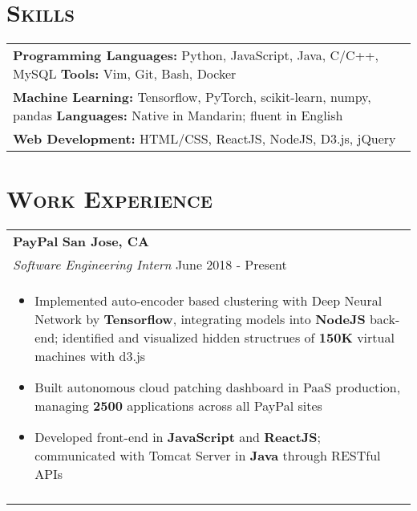 \documentclass[letterpaper,11pt]{article} %
\begin{document}
{\section{\Large\bf\textsc{Skills}}
\begin{tabular}{p{18.5cm}}
{\bf{Programming Languages:}} Python, JavaScript, Java, C/C++, MySQL
\hspace{3.7mm} {\bf{Tools:}} Vim, Git, Bash, Docker \\
{\bf{Machine Learning:}} Tensorflow, PyTorch, scikit-learn, numpy, pandas
\hspace{3mm} {\bf{Languages:}} Native in Mandarin; fluent in English\\
{\bf{Web Development:}} HTML/CSS, ReactJS, NodeJS, D3.js, jQuery
\end{tabular}

\section{\Large\bf\textsc{Work Experience}}
\begin{tabular}{p{18.5cm}}

{\bf{PayPal}} \hfill \bf{San Jose, CA}\\
{\it Software Engineering Intern} \hfill June 2018 - Present\\%
\begin{itemize}
\vspace{-3mm}
\item Implemented auto-encoder based clustering with Deep Neural Network by {\bf Tensorflow}, integrating models into {\bf NodeJS} back-end; identified and visualized hidden structrues of {\bf 150K} virtual machines with d3.js 
\item Built autonomous cloud patching dashboard in PaaS production, managing {\bf 2500} applications across all PayPal sites 
\item Developed front-end in {\bf JavaScript} and {\bf ReactJS}; communicated with Tomcat Server in {\bf Java} through RESTful APIs
\vspace*{-\baselineskip} 
\end{itemize} \\ 
\vspace{.1mm}


\end{tabular}}
\end{document}
